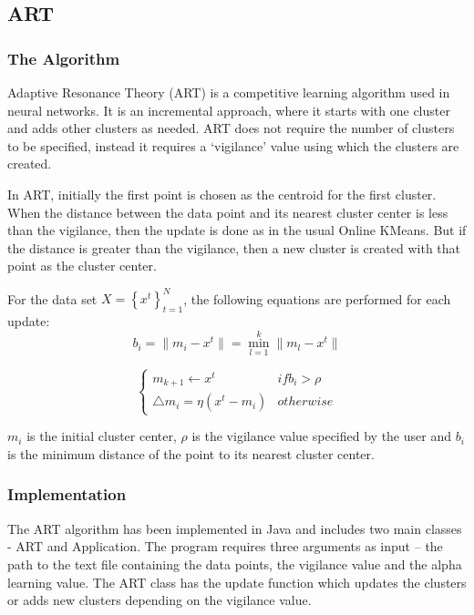 \documentclass{lmproj}
\begin{document}
\subsection{ART}
\subsubsection{The Algorithm}
Adaptive Resonance Theory (ART) is a competitive learning algorithm used in neural networks. It is an incremental approach, where it starts with one cluster and adds other clusters as needed. ART does not require the number of clusters to be specified, instead it requires a ‘vigilance’ value using which the clusters are created.

In ART, initially the first point is chosen as the centroid for the first cluster. When the distance between the data point and its nearest cluster center is less than the vigilance, then the update is done as in the usual Online KMeans. But if the distance is greater than the vigilance, then a new cluster is created with that point as the cluster center.

For the data set $X = \left\{ {x^{t}}\right\}_{t=1}^N$, the following equations are performed for each update:
\begin{equation}
b_{i} = \parallel{m_{i}} - x^{t}\parallel  = \min_{l=1}^k \parallel  m_{l} - x^{t}∥
\end{equation}
 
\begin{equation}
\begin{cases}
m_{k+1}\leftarrow x^{t} & if b_{i}>\rho
\\\triangle{m_{i}}=\eta\left(x^{t} - m_{i}\right) & otherwise
\end{cases}
\end{equation}

$m_{i}$ is the initial cluster center, $\rho$ is the vigilance value specified by the user and $b_{i}$ is the minimum distance of the point to its nearest cluster center. 
 
\subsubsection{Implementation}
The ART algorithm has been implemented in Java and includes two main classes - ART and Application. The program requires three arguments as input – the path to the text file containing the data points, the vigilance value and the alpha learning value. 
The ART class has the update function which updates the clusters or adds new clusters depending on the vigilance value.

\end{document}
